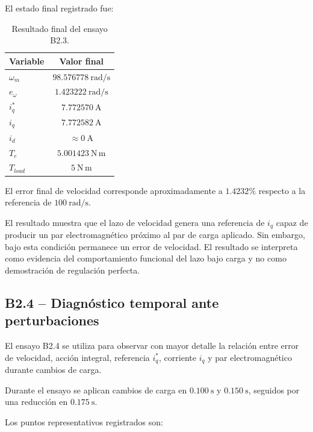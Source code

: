El estado final registrado fue:

\begin{table}[H]
\centering
\caption{Resultado final del ensayo B2.3.}
\label{tab:b2_3_resultado}
\begin{tabular}{lc}
\toprule
\textbf{Variable} & \textbf{Valor final} \\
\midrule
\(\omega_m\) & \(98.576778~\mathrm{rad/s}\) \\
\(e_{\omega}\) & \(1.423222~\mathrm{rad/s}\) \\
\(i_q^*\) & \(7.772570~\mathrm{A}\) \\
\(i_q\) & \(7.772582~\mathrm{A}\) \\
\(i_d\) & \(\approx0~\mathrm{A}\) \\
\(T_e\) & \(5.001423~\mathrm{N\,m}\) \\
\(T_{load}\) & \(5~\mathrm{N\,m}\) \\
\bottomrule
\end{tabular}
\end{table}

El error final de velocidad corresponde aproximadamente a \(1.4232\%\) respecto a la referencia de \(100~\mathrm{rad/s}\).

El resultado muestra que el lazo de velocidad genera una referencia de \(i_q\) capaz de producir un par electromagnético próximo al par de carga aplicado. Sin embargo, bajo esta condición permanece un error de velocidad. El resultado se interpreta como evidencia del comportamiento funcional del lazo bajo carga y no como demostración de regulación perfecta.

\subsection{B2.4 -- Diagnóstico temporal ante perturbaciones}

El ensayo B2.4 se utiliza para observar con mayor detalle la relación entre error de velocidad, acción integral, referencia \(i_q^*\), corriente \(i_q\) y par electromagnético durante cambios de carga.

Durante el ensayo se aplican cambios de carga en \(0.100~\mathrm{s}\) y \(0.150~\mathrm{s}\), seguidos por una reducción en \(0.175~\mathrm{s}\).

Los puntos representativos registrados son:

